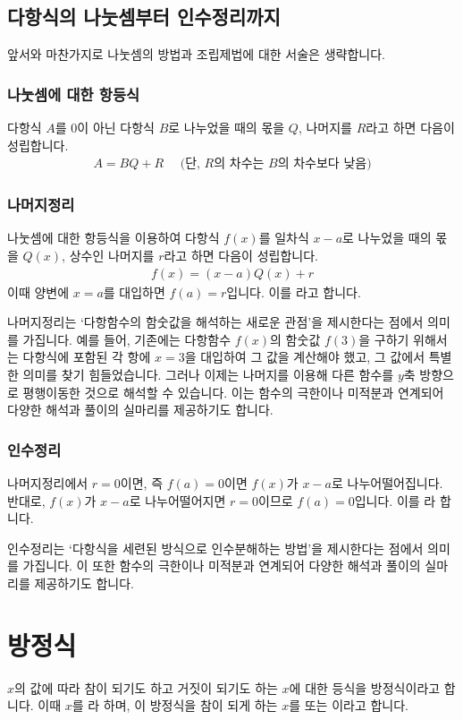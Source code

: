 \subsection{다항식의 나눗셈부터 인수정리까지}
앞서와 마찬가지로 나눗셈의 방법과 조립제법에 대한 서술은 생략합니다.
\subsubsection{나눗셈에 대한 항등식}
다항식 $A$를 $0$이 아닌 다항식 $B$로 나누었을 때의 몫을 $Q$, 나머지를 $R$라고 하면 다음이 성립합니다. \begin{align*} A=BQ+R \quad \text{ (단, $R$의 차수는 $B$의 차수보다 낮음)} \end{align*}
\subsubsection{나머지정리}
나눗셈에 대한 항등식을 이용하여 다항식 $f\left( x \right) $를 일차식 $x-a$로 나누었을 때의 몫을 $Q\left( x \right) $, 상수인 나머지를 $r$라고 하면 다음이 성립합니다. \begin{align*} f\left( x \right) =\left( x-a \right)Q\left( x \right)  +r\end{align*}
이때 양변에 $x=a$를 대입하면 $f\left( a \right) = r$입니다. 이를 라고 합니다.

나머지정리는 `다항함수의 함숫값을 해석하는 새로운 관점'을 제시한다는 점에서 의미를 가집니다. 예를 들어, 기존에는 다항함수 $f\left( x \right) $의 함숫값 $f\left( 3 \right) $을 구하기 위해서는 다항식에 포함된 각 항에 $x=3$을 대입하여 그 값을 계산해야 했고, 그 값에서 특별한 의미를 찾기 힘들었습니다. 그러나 이제는 나머지를 이용해 다른 함수를 $y$축 방향으로 평행이동한 것으로 해석할 수 있습니다. 이는 함수의 극한이나 미적분과 연계되어 다양한 해석과 풀이의 실마리를 제공하기도 합니다.

\subsubsection{인수정리}
나머지정리에서 $r=0$이면, 즉 $f\left( a \right) =0$이면 $f(x)$가 $x-a$로 나누어떨어집니다. 반대로, $f(x)$가 $x-a$로 나누어떨어지면 $r=0$이므로 $f\left( a \right) =0$입니다. 이를 라 합니다.

인수정리는 `다항식을 세련된 방식으로 인수분해하는 방법'을 제시한다는 점에서 의미를 가집니다. 이 또한 함수의 극한이나 미적분과 연계되어 다양한 해석과 풀이의 실마리를 제공하기도 합니다.
\clearpage
\section{방정식}
$x$의 값에 따라 참이 되기도 하고 거짓이 되기도 하는 $x$에 대한 등식을 방정식이라고 합니다. 이때 $x$를 라 하며, 이 방정식을 참이 되게 하는 $x$를  또는 이라고 합니다.

